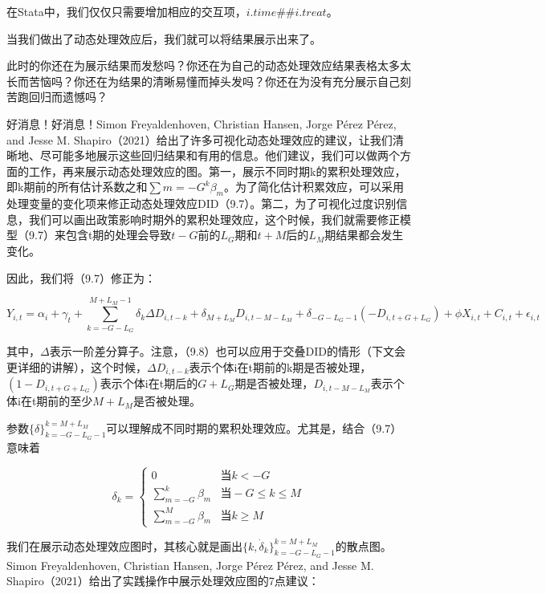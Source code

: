 \documentclass[cn,12pt,math=newtx,citestyle=gb7714-2015,bibstyle=gb7714-2015]{elegantbook}
\begin{document}
	在Stata中，我们仅仅只需要增加相应的交互项，$i.time \#\# i.treat$。
	
	当我们做出了动态处理效应后，我们就可以将结果展示出来了。
	
	此时的你还在为展示结果而发愁吗？你还在为自己的动态处理效应结果表格太多太长而苦恼吗？你还在为结果的清晰易懂而掉头发吗？你还在为没有充分展示自己刻苦跑回归而遗憾吗？
	
	好消息！好消息！Simon Freyaldenhoven, Christian Hansen, Jorge Pérez Pérez, and Jesse M. Shapiro（2021）给出了许多可视化动态处理效应的建议，让我们清晰地、尽可能多地展示这些回归结果和有用的信息。他们建议，我们可以做两个方面的工作，再来展示动态处理效应的图。第一，展示不同时期k的累积处理效应，即k期前的所有估计系数之和$\sum{m=-G}^{k}\beta_m$。为了简化估计积累效应，可以采用处理变量的变化项来修正动态处理效应DID（9.7）。第二，为了可视化过度识别信息，我们可以画出政策影响时期外的累积处理效应，这个时候，我们就需要修正模型（9.7）来包含t期的处理会导致$t-G$前的$L_G$期和$t+M$后的$L_M$期结果都会发生变化。
	
	因此，我们将（9.7）修正为：
	
		\begin{equation}
		Y_{i,t} = \alpha_i + \gamma_t + \sum_{k= -G-L_G}^{M+L_M-1} \delta_k \Delta D_{i,t-k} + \delta_{M+L_M}D_{i,t-M-L_M} + \delta_{-G-L_G-1}(-D_{i,t+G+L_G}) + \phi X_{i,t} + C_{i,t} + \epsilon_{i,t}
	\end{equation}
	
	其中，$\Delta$表示一阶差分算子。注意，（9.8）也可以应用于交叠DID的情形（下文会更详细的讲解），这个时候，$\Delta D_{i,t-k}$表示个体i在t期前的k期是否被处理，$(1-D_{i,t+G+L_G})$表示个体i在t期后的$G+L_G$期是否被处理，$D_{i,t-M-L_M}$表示个体i在t期前的至少$M+L_M$是否被处理。
	
	参数$\{\delta\}_{k=-G-L_G-1}^{k=M+L_M}$可以理解成不同时期的累积处理效应。尤其是，结合（9.7）意味着
	
\begin{equation}
\delta_k =	\begin{cases}
		 0  & \text{当} k< -G \\
		\sum_{m=-G}^{k}\beta_m    &\text{当}-G \le k \le M \\
		\sum_{m=-G}^{M}\beta_m  & \text{当} k \ge M 
	\end{cases}
\end{equation}
		
我们在展示动态处理效应图时，其核心就是画出$\{k,\dot{\delta}_k\}_{k=-G-L_G-1}^{k=M+L_M}$的散点图。Simon Freyaldenhoven, Christian Hansen, Jorge Pérez Pérez, and Jesse M. Shapiro（2021）给出了实践操作中展示处理效应图的7点建议：
\end{document}
